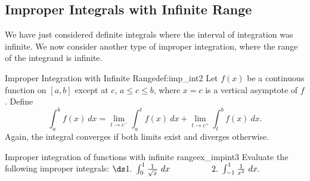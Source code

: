 \subsection*{Improper Integrals with Infinite Range}

We have just considered definite integrals where the interval of integration was infinite. We now consider another type of improper integration, where the range of the integrand is infinite.


\begin{definition}{Improper Integration with Infinite Range}{def:imp_int2}
{Let $f(x)$ be a continuous function on $[a,b]$ except at $c$, $a\leq c\leq b$, where $x=c$ is a vertical asymptote of $f$. Define
$$\int_a^b f(x)\ dx = \lim_{t\to c^-}\int_a^t f(x)\ dx + \lim_{t\to c^+}\int_t^b f(x)\ dx.$$
Again, the integral converges if both limits exist and diverges otherwise.
} 
\end{definition}


\begin{example}{Improper integration of functions with infinite range}{ex_impint3}
{
Evaluate the following improper integrals:
\vskip 10pt
$\ds 1.\ \int_0^1\frac1{\sqrt{x}}\ dx \hskip 50pt 2. \ \int_{-1}^1\frac{1}{x^2}\ dx.$
}
\end{example}


